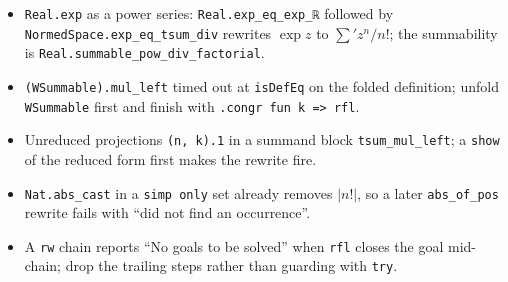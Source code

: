 \documentclass[11pt]{article}
\begin{document}
\begin{itemize}
\item \texttt{Real.exp} as a power series: \texttt{Real.exp\_eq\_exp\_ℝ} followed by
\texttt{NormedSpace.exp\_eq\_tsum\_div} rewrites $\exp z$ to $\sum'z^n/n!$; the summability is
\texttt{Real.summable\_pow\_div\_factorial}.
\item \texttt{(WSummable).mul\_left} timed out at \texttt{isDefEq} on the folded definition; unfold
\texttt{WSummable} first and finish with \texttt{.congr fun k => rfl}.
\item Unreduced projections \texttt{(n, k).1} in a summand block \texttt{tsum\_mul\_left}; a
\texttt{show} of the reduced form first makes the rewrite fire.
\item \texttt{Nat.abs\_cast} in a \texttt{simp only} set already removes $|n!|$, so a later
\texttt{abs\_of\_pos} rewrite fails with ``did not find an occurrence''.
\item A \texttt{rw} chain reports ``No goals to be solved'' when \texttt{rfl} closes the goal
mid-chain; drop the trailing steps rather than guarding with \texttt{try}.
\end{itemize}
\end{document}
